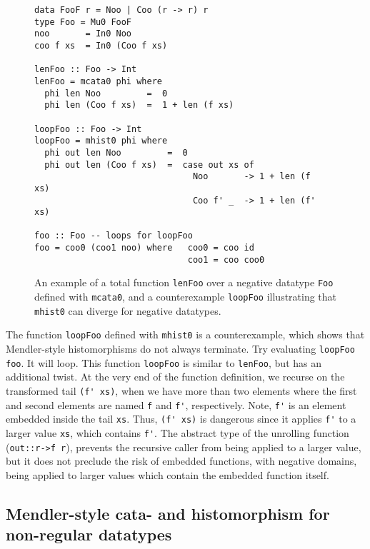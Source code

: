 \documentclass[letterpaper,12pt]{article}
\begin{document}
\begin{figure}
\begin{verbatim}
data FooF r = Noo | Coo (r -> r) r
type Foo = Mu0 FooF
noo       = In0 Noo
coo f xs  = In0 (Coo f xs)

lenFoo :: Foo -> Int
lenFoo = mcata0 phi where
  phi len Noo         =  0
  phi len (Coo f xs)  =  1 + len (f xs)

loopFoo :: Foo -> Int
loopFoo = mhist0 phi where
  phi out len Noo         =  0
  phi out len (Coo f xs)  =  case out xs of
                               Noo       -> 1 + len (f   xs)
                               Coo f' _  -> 1 + len (f'  xs)

foo :: Foo -- loops for loopFoo
foo = coo0 (coo1 noo) where   coo0 = coo id
                              coo1 = coo coo0
\end{verbatim}
\caption{An example of a total function \texttt{lenFoo}
         over a negative datatype \texttt{Foo} defined with \texttt{mcata0},
     and a counterexample \texttt{loopFoo} illustrating that \texttt{mhist0}
         can diverge for negative datatypes.}
\label{fig:LoopHisto}
\end{figure}
The function \verb|loopFoo| defined with \verb|mhist0| is a counterexample, which
shows that Mendler-style histomorphisms do not always terminate.
Try evaluating \verb|loopFoo foo|.  It will loop.  This function \verb|loopFoo| is
similar to \verb|lenFoo|, but has an additional twist.  At the very end of the
function definition, we recurse on the transformed tail \verb|(f' xs)|,
when we have more than two elements where the first and second elements
are named \verb|f| and \verb|f'|, respectively.  Note, \verb|f'| is an element embedded
inside the tail \verb|xs|.  Thus, \verb|(f' xs)| is dangerous since it applies \verb|f'|
to a larger value \verb|xs|, which contains \verb|f'|.
The abstract type of the unrolling function (\verb|out::r->f r|),
prevents the recursive caller from being applied to a larger value, but it
does not preclude the risk of embedded functions, with negative domains,
being applied to larger values which contain the embedded function
itself.

\subsection{Mendler-style cata- and histomorphism for non-regular datatypes}
\label{sec:bg:nonreg}
\end{document}
